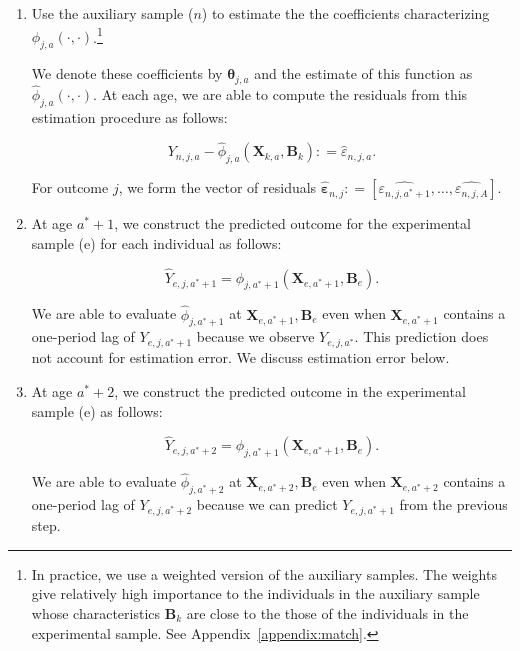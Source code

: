 \begin{enumerate}
\item Use the auxiliary sample ($n$) to estimate the the coefficients characterizing $\phi_{j,a} \left( \cdot , \cdot \right)$.\footnote{In practice, we use a weighted version of the auxiliary samples. The weights give relatively high importance to the individuals in the auxiliary sample whose characteristics $\bm{B}_k$ are close to the those of the individuals in the experimental sample. See Appendix~\ref{appendix:match}.}

We denote these coefficients by $\bm{\theta}_{j,a}$ and the estimate of this function as $\hat{\phi}_{j,a} \left( \cdot , \cdot \right)$. At each age, we are able to compute the residuals from this estimation procedure as follows:

\begin{equation}
Y_{n,j,a} -  \hat{\phi}_{j,a} (\bm{X}_{k,a}, \bm{B}_k) : = \hat{\varepsilon}_{n,j,a}.
\end{equation}

For outcome $j$, we form the vector of residuals $\hat{\bm{\varepsilon}}_{n,j} : = \left[ \hat{\varepsilon_{n,j,a^*+1}}, \ldots, \hat{\varepsilon_{n,j,A}} \right]$.

\item At age $a^*+1$, we construct the predicted outcome for the experimental sample (e) for each individual as follows:

\begin{equation}
\hat{Y}_{e,j,a^*+1} = \hat{\phi}_{j,a^*+1} \left( \bm{X}_{e,a^*+1}, \bm{B}_e \right).
\end{equation}

\noindent We are able to evaluate $\hat{\phi}_{j,a^*+1}$ at $ \bm{X}_{e,a^*+1}, \bm{B}_e $ even when $\bm{X}_{e,a^*+1}$ contains a one-period lag of $Y_{e,j,a^*+1}$ because we observe $Y_{e,j,a^*}$. This prediction does not account for estimation error. We discuss estimation error below.

\item At age $a^*+2$, we construct the predicted outcome in the experimental sample (e) as follows:

\begin{equation}
\hat{Y}_{e,j,a^*+2} = \hat{\phi}_{j,a^*+1} \left( \bm{X}_{e,a^*+1}, \bm{B}_e \right).
\end{equation}

\noindent We are able to evaluate $\hat{\phi}_{j,a^*+2}$ at $ \bm{X}_{e,a^*+2}, \bm{B}_e $ even when $\bm{X}_{e,a^*+2}$ contains a one-period lag of $Y_{e,j,a^*+2}$ because we can predict $Y_{e,j,a^*+1}$ from the previous step.


\end{enumerate}
